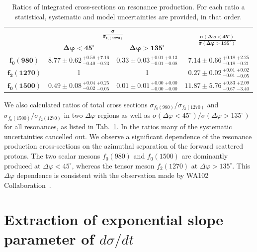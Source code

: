 {
\renewcommand{\arraystretch}{1.5}
\begin{table}[]\centering
\begin{tabular}{cc c c}%
~ & \multicolumn{2}{c}{$\bm{\frac{\sigma}{\sigma_{f_{2}(1270)}}}$} & \multirow{2}{*}{$\bm{\frac{\sigma(\Delta\varphi<45^{\circ})}{\sigma(\Delta\varphi>135^{\circ})}}$} \\
~ & $\bm{\Delta\varphi<45^{\circ}}$ & $\bm{\Delta\varphi>135^{\circ}}$ & \\ \hline\hline
$\bm{f_{0}(980)}$ & $8.77 \pm 0.62\,^{+0.58}_{-0.40}\,^{+7.16}_{-0.23}$ & $0.33 \pm 0.03\,^{+0.01}_{-0.01}\,^{+0.13}_{-0.08}$ & $\phantom{1}7.14 \pm 0.66 \,^{+0.18}_{-0.18}\,^{+2.25}_{-0.21}$\\ %
$\bm{f_{2}(1270)}$ & 1 & 1 & $\phantom{1}0.27 \pm 0.02\,^{+0.01}_{-0.01} \,^{+0.02}_{-0.05}$\\ %
$\bm{f_{0}(1500)}$ & $0.49 \pm 0.08\,^{+0.04}_{-0.02}\,^{+0.25}_{-0.05}$ & $0.01 \pm 0.01\,^{+0.00}_{-0.00}\,^{+0.00}_{-0.00}$ & $11.87 \pm 5.76\,^{+0.83}_{-0.67} \,^{+2.09}_{-3.40}$\\ %
\end{tabular}
\caption{Ratios of integrated cross-sections on resonance production. For each ratio a statistical, systematic and model uncertainties are provided, in that order.}\label{tab:resonanceRatio}
\end{table}
}
%
\indent
We also calculated ratios of total cross sections $\sigma_{f_0(980)}/\sigma_{f_2(1270)}$ and $\sigma_{f_0(1500)}/\sigma_{f_2(1270)}$ in two $\Delta \varphi$ regions as well as $\sigma(\Delta \varphi<45^{\circ})/\sigma(\Delta \varphi>135^{\circ})$ for 
all resonances, as listed in Tab.~\ref{tab:resonanceRatio}. In the ratios many of the systematic uncertainties cancelled out.
We observe a significant dependence of the resonance production cross-sections on the azimuthal separation of the forward scattered protons. The two scalar mesons $f_{0}(980)$ and $f_{0}(1500)$ are dominantly produced at $\Delta\varphi<45^{\circ}$, whereas the tensor meson $f_{2}(1270)$ at $\Delta\varphi>135^{\circ}$. This $\Delta\varphi$ dependence is consistent with the observation made by WA102 Collaboration~\cite{WA102}.






\section{Extraction of exponential slope parameter of $d\sigma/dt$}\label{sec:InvMassFit}



